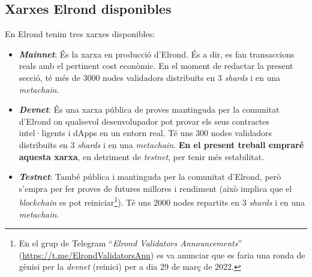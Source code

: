 \documentclass[11pt,a4paper]{article}
\begin{document}
\subsection{Xarxes Elrond disponibles}\label{sub:xarxes}
En Elrond tenim tres xarxes disponibles:
\begin{itemize}
\item \textbf{\textit{Mainnet}}: És la xarxa en producció d'Elrond. És a dir, es fan transaccions reals amb  el pertinent cost econòmic. En el moment de redactar la present secció, té més de 3000 nodes validadors distribuïts en 3 \textit{shards} i en una \textit{metachain}.
\item \textbf{\textit{Devnet}}: És una xarxa pública de proves mantinguda per la comunitat d'Elrond on qualsevol desenvolupador pot provar els seus contractes intel·ligents i dApps en un entorn real. Té uns 300 nodes validadors distribuïts en 3 \textit{shards} i en una \textit{metachain}. \textbf{En el present treball empraré aquesta xarxa}, en detriment de \textit{testnet}, per tenir més estabilitat.
\item \textbf{\textit{Testnet}}: També pública i mantinguda per la comunitat d'Elrond, però s'empra per fer proves de futures millores i rendiment \cite{mincub2019-2} (això implica que el \textit{blockchain} es pot reiniciar\footnote{En el grup de Telegram ``\textit{Elrond Validators Announcements}'' (\url{https://t.me/ElrondValidatorsAnn}) es va anunciar que es faria una ronda de gènisi per la \textit{devnet} (reinici) per a dia 29 de març de 2022.}). Té uns 2000 nodes repartits en 3 \textit{shards} i en una \textit{metachain}.
\end{itemize}
\end{document}
